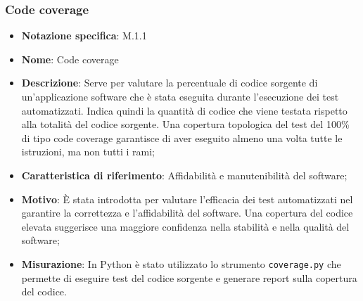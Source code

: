 \subsubsection{Code coverage}
\begin{itemize}
    \item \textbf{Notazione specifica}: M.1.1
    \item \textbf{Nome}: Code coverage
    \item \textbf{Descrizione}: Serve per valutare la percentuale di codice sorgente di un'applicazione software che è stata eseguita durante l'esecuzione dei test automatizzati. Indica quindi la quantità di codice che viene testata rispetto alla totalità del codice sorgente. Una copertura topologica del test del 100\% di tipo code coverage garantisce di aver eseguito almeno una volta tutte le istruzioni, ma non tutti i rami;
    \item \textbf{Caratteristica di riferimento}: Affidabilità e manutenibilità del software;
    \item \textbf{Motivo}: È stata introdotta per valutare l'efficacia dei test automatizzati nel garantire la correttezza e l'affidabilità del software. Una copertura del codice elevata suggerisce una maggiore confidenza nella stabilità e nella qualità del software;
    \item \textbf{Misurazione}: In Python è stato utilizzato lo strumento \texttt{coverage.py} che permette di eseguire test del codice sorgente e generare report sulla copertura del codice.

\end{itemize}
